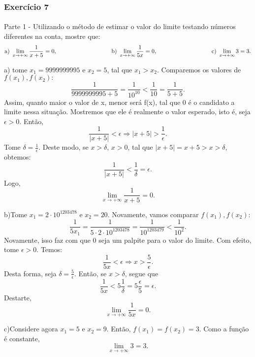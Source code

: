 \subsubsection{Exerc\'icio 7}
\paragraph{}Parte 1 - Utilizando o m\'etodo de estimar o valor do limite testando n\'umeros diferentes na conta, mostre que:
$$
\text{a) }\lim_{x\to+\infty}\frac{1}{x + 5} = 0,\hspace{3.3cm}
\text{b) }\lim_{x\to+\infty}\frac{1}{5x} = 0,\hspace{3.3cm}
\text{c) }\lim_{x\to+\infty}3 = 3.
$$
\begin{sol*}
a) tome $x_1 = 9999999995$ e $x_2 = 5$, tal que $x_1 > x_2$. Comparemos os valores de $f(x_1), f(x_2):$
$$
\frac{1}{9999999995 + 5} =\frac{1}{10^10} < \frac{1}{10} = \frac{1}{5 + 5}.
$$
Assim, quanto maior o valor de x, menor ser\'a f(x), tal que 0 \'e o candidato a limite nessa situa\c c\~ao. Mostremos que ele \'e realmente o valor esperado, isto \'e, seja $\epsilon > 0$. Ent\~ao, 
$$
\frac{1}{|x + 5|} < \epsilon \Rightarrow |x + 5| > \frac{1}{\epsilon}.
$$
Tome $\delta = \frac{1}{\epsilon}.$ Deste modo, se $x > \delta$, $x > 0$, tal que $|x + 5| = x + 5 > x > \delta$, obtemos:
$$
\frac{1}{|x + 5|} < \frac{1}{\delta} = \epsilon.
$$
Logo, 
$$
\lim_{x\to+\infty}\frac{1}{x + 5} = 0.
$$

b)Tome $x_1 = 2\cdot{10^{1203478}}$ e $x_2 = 20.$ Novamente, vamos comparar $f(x_1), f(x_2)$:
$$
\frac{1}{5x_1} = \frac{1}{5\cdot2\cdot{10^{1203478}}} = \frac{1}{10^{1203479}} < \frac{1}{10^2}.
$$
Novamente, isso faz com que 0 seja um palpite para o valor do limite. Com efeito, tome $\epsilon > 0$. Temos:
$$
\frac{1}{5x} < \epsilon \Rightarrow x > \frac{5}{\epsilon}.
$$
Desta forma, seja $\delta = \frac{5}{\epsilon}.$ Ent\~ao, se $x > \delta$, segue que 
$$
\frac{1}{5x} < 5\frac{1}{\delta} = 5\frac{\epsilon}{5} = \epsilon.
$$
Destarte, 
$$
\lim_{x\to+\infty}\frac{1}{5x} = 0.
$$

c)Considere agora $x_1 = 5$ e $x_2 = 9$. Ent\~ao, $f(x_1) = f(x_2) = 3.$ Como a fun\c c\~ao \'e constante, 
$$
\lim_{x\to+\infty}3 = 3.
$$
\qedsymbol
\end{sol*}

